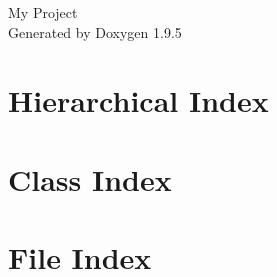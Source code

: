 \documentclass[twoside]{book}
\newcommand{\+}{\discretionary{\mbox{\scriptsize$\hookleftarrow$}}{}{}}
\newcommand{\clearemptydoublepage}{%
    \newpage{\pagestyle{empty}\cleardoublepage}%
  }
\begin{document}
  \raggedbottom
    \hypersetup{pageanchor=false,
                bookmarksnumbered=true,
                pdfencoding=unicode
               }
  \begin{titlepage}
  \vspace*{7cm}
  \begin{center}%
  {\Large My Project}\\
  \vspace*{1cm}
  {\large Generated by Doxygen 1.9.5}\\
  \end{center}
  \end{titlepage}
  \clearemptydoublepage
  \tableofcontents
  \clearemptydoublepage
  \hypersetup{pageanchor=true}
\chapter{Hierarchical Index}

\chapter{Class Index}

\chapter{File Index}

\end{document}
